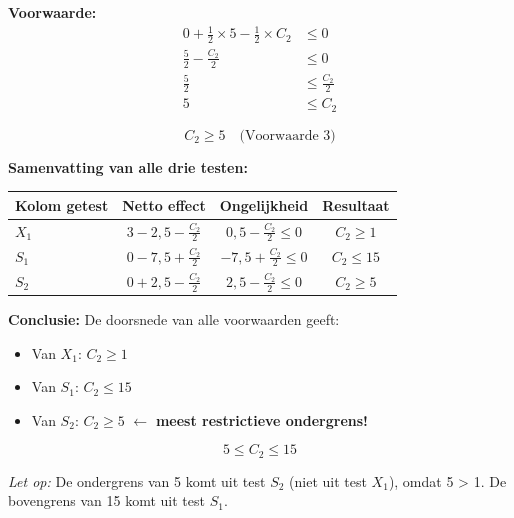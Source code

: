 \documentclass[a4paper,11pt]{article}
\begin{document}
\begin{oefenblok}
    \textbf{Voorwaarde:}
    \begin{align*}
        0 + \frac{1}{2} \times 5 - \frac{1}{2} \times C_2 & \leq 0             \\
        \frac{5}{2} - \frac{C_2}{2}                       & \leq 0             \\
        \frac{5}{2}                                       & \leq \frac{C_2}{2} \\
        5                                                 & \leq C_2
    \end{align*}

    $$\boxed{C_2 \geq 5} \quad \text{(Voorwaarde 3)}$$

    \textbf{Samenvatting van alle drie testen:}

    \begin{center}
        \begin{tabular}{|l|c|c|c|}
            \hline
            \textbf{Kolom getest} & \textbf{Netto effect}     & \textbf{Ongelijkheid}         & \textbf{Resultaat} \\
            \hline
            $X_1$                 & $3 - 2{,}5 - \frac{C_2}{2}$ & $0{,}5 - \frac{C_2}{2} \leq 0$  & $C_2 \geq 1$       \\
            \hline
            $S_1$                 & $0 - 7{,}5 + \frac{C_2}{2}$ & $-7{,}5 + \frac{C_2}{2} \leq 0$ & $C_2 \leq 15$      \\
            \hline
            $S_2$                 & $0 + 2{,}5 - \frac{C_2}{2}$ & $2{,}5 - \frac{C_2}{2} \leq 0$  & $C_2 \geq 5$       \\
            \hline
        \end{tabular}
    \end{center}

    \vspace{0.3cm}

    \textbf{Conclusie:} De doorsnede van alle voorwaarden geeft:
    \begin{itemize}
        \item Van $X_1$: $C_2 \geq 1$
        \item Van $S_1$: $C_2 \leq 15$
        \item Van $S_2$: $C_2 \geq 5$ \quad $\leftarrow$ \textbf{meest restrictieve ondergrens!}
    \end{itemize}

    $$\boxed{5 \leq C_2 \leq 15}$$

    \textit{Let op:} De ondergrens van 5 komt uit test $S_2$ (niet uit test $X_1$), omdat 5 > 1. De bovengrens van 15 komt uit test $S_1$.


\end{oefenblok}
\end{document}
